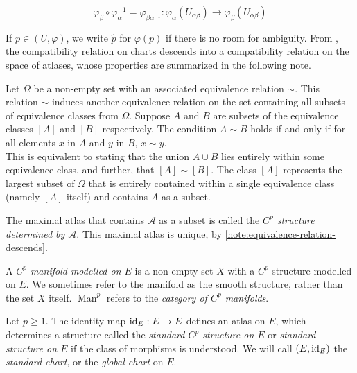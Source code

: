 \documentclass[../main-v2-manifolds.tex]{subfiles}
\begin{document}
\begin{equation}\label{def-transition-map}
    \varphi_{\beta}\circ\varphi_{\alpha}^{-1}=\varphi_{\beta\alpha^{-1}}: \varphi_{\alpha}(U_{\alpha\beta})\to\varphi_{\beta}(U_{\alpha\beta})
\end{equation}

If $p\in (U,\varphi)$, we write $\hat{p}$ for $\varphi(p)$ if there is no room for ambiguity. From , the compatibility relation on charts descends into a compatibility relation on the space of atlases, whose properties are summarized in the following note.

\begin{note}\label{note:equivalence-relation-descends}
    Let \( \Omega \) be a non-empty set with an associated equivalence relation \( \sim \). This relation \( \sim \) induces another equivalence relation on the set containing all subsets of equivalence classes from \( \Omega \). Suppose \( A \) and \( B \) are subsets of the equivalence classes \( [A] \) and \( [B] \) respectively. The condition \( A \sim B \) holds if and only if for all elements \( x \) in \( A \) and \( y \) in \( B \), \( x \sim y \).\\
    
     This is equivalent to stating that the union \( A \cup B \) lies entirely within some equivalence class, and further, that \( [A] \sim [B] \). The class \( [A] \) represents the largest subset of \( \Omega \) that is entirely contained within a single equivalence class (namely $[A]$ itself) and contains $A$ as a subset.
\end{note}

\begin{definition}\label{def:structure-of-manifold}
    The maximal atlas that contains $\mathcal{A}$ as a subset is called the \emph{$C^p$ structure determined by $\mathcal{A}$}. This maximal atlas is unique, by \cref{note:equivalence-relation-descends}.
\end{definition}
\begin{definition}[Manifold]\label{def:manifold}
    A \emph{$C^p$ manifold modelled on $E$} is a non-empty set $X$ with a $C^p$ structure modelled on $E$. We sometimes refer to the manifold as the smooth structure, rather than the set $X$ itself. $\operatorname{Man}^p$ refers to the \emph{category of $C^p$ manifolds}.
\end{definition}
\begin{wts}[$E$ is a manifold]\label{prop:banach-space-is-manifold}
    Let $p\geq 1$. The identity map $\operatorname{id}_{E}: E\to E$ defines an atlas on $E$, which determines a structure called the \emph{standard $C^p$ structure on $E$} or \emph{standard structure on $E$} if the class of morphisms is understood. We will call $(E,\operatorname{id}_{E})$ the \emph{standard chart}, or the \emph{global chart} on $E$.
\end{wts}
\end{document}
